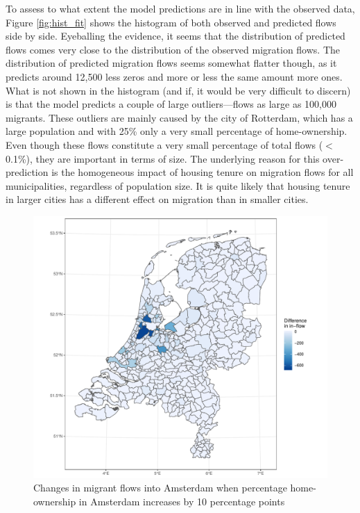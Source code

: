 \documentclass[fleqn,10pt]{SelfArx} %
\begin{document}
{{To assess to what extent the model predictions are in line with the
observed data, Figure \ref{fig:hist_fit} shows the histogram of both
observed and predicted flows side by side. Eyeballing the evidence, it
seems that the distribution of predicted flows comes very close to the
distribution of the observed migration flows. The distribution of
predicted migration flows seems somewhat flatter though, as it
predicts around 12,500 less zeros and more or less the same amount
more ones. What is not shown in the histogram (and if, it would be
very difficult to discern) is that the model predicts a couple of
large outliers---flows as large as 100,000 migrants. These outliers are mainly caused by the city of Rotterdam, which has a large population and with 25\% only a very small 
percentage of home-ownership. Even though these flows constitute a very small percentage of total flows ($<$ 0.1\%), they are important in terms of size. The underlying reason
for this over-prediction is the homogeneous impact of housing tenure on migration flows for all municipalities, regardless of population size. It is quite likely that housing tenure in larger cities
has a different effect on migration than in smaller cities. 

\begin{figure}
	\centering \includegraphics[width =
	\columnwidth]{../fig/p_diff_in.pdf}
	\caption{Changes in migrant flows into Amsterdam when percentage home-ownership
		in Amsterdam increases by 10 percentage points}\label{fig:diff_in}
\end{figure}

}}
\end{document}
